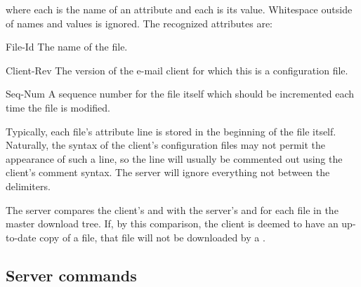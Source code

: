 \noindent
where each  is the name of an attribute and each 
is its value.  Whitespace outside of names and values is ignored.  The
recognized attributes are:

\begin{codelist}
\item[File-Id] The name of the file.
\item[Client-Rev] The version of the e-mail client for which this is a
configuration file.
\item[Seq-Num] A sequence number for the file itself which should be
incremented each time the file is modified.
\end{codelist}

Typically, each file's attribute line is stored in the beginning of
the file itself.  Naturally, the syntax of the client's configuration
files may not permit the appearance of such a line, so the line will
usually be commented out using the client's comment syntax.  The
server will ignore everything not between the \code{-\%-} delimiters.

The server compares the client's  and 
with the server's  and  for each file
in the master download tree.  If, by this comparison, the client is
deemed to have an up-to-date copy of a file, that file will not be
downloaded by a .

\subsection{Server commands}

